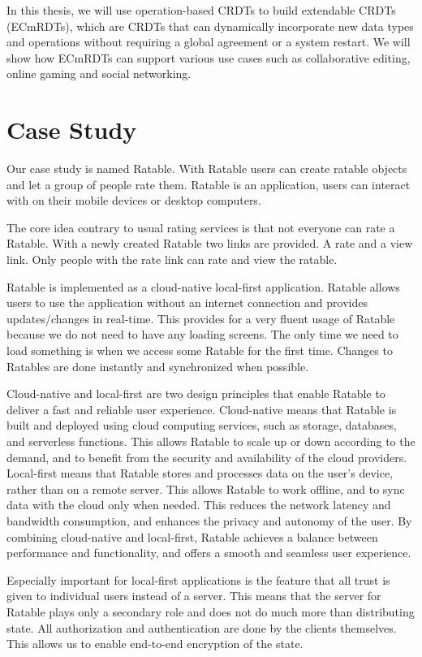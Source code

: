 \documentclass[
	ngerman,
	ruledheaders=section,   %
	class=report,		    %
	thesis={type=bachelor}, %
	accentcolor=9c,			%
	custommargins=true,    %
	marginpar=false,        %
	parskip=half-,          %
	fontsize=11pt,          %
]{tudapub}
\begin{document}
In this thesis, we will use operation-based CRDTs to build extendable CRDTs (ECmRDTs), which are CRDTs that can dynamically incorporate new data types and operations without requiring a global agreement or a system restart. We will show how ECmRDTs can support various use cases such as collaborative editing, online gaming and social networking.

\chapter{Case Study}
Our case study is named Ratable. With Ratable users can create ratable objects and let a group of people rate them. Ratable is an application, users can interact with on their mobile devices or desktop computers. 

The core idea contrary to usual rating services is that not everyone can rate a Ratable. With a newly created Ratable two links are provided. A rate and a view link. Only people with the rate link can rate and view the ratable.

Ratable is implemented as a cloud-native local-first application. Ratable allows users to use the application without an internet connection and provides updates/changes in real-time. This provides for a very fluent usage of Ratable because we do not need to have any loading screens. The only time we need to load something is when we access some Ratable for the first time. Changes to Ratables are done instantly and synchronized when possible.

Cloud-native and local-first are two design principles that enable Ratable to deliver a fast and reliable user experience. Cloud-native means that Ratable is built and deployed using cloud computing services, such as storage, databases, and serverless functions. This allows Ratable to scale up or down according to the demand, and to benefit from the security and availability of the cloud providers. Local-first means that Ratable stores and processes data on the user’s device, rather than on a remote server. This allows Ratable to work offline, and to sync data with the cloud only when needed. This reduces the network latency and bandwidth consumption, and enhances the privacy and autonomy of the user. By combining cloud-native and local-first, Ratable achieves a balance between performance and functionality, and offers a smooth and seamless user experience.

Especially important for local-first applications is the feature that all trust is given to individual users instead of a server. This means that the server for Ratable plays only a secondary role and does not do much more than distributing state. All authorization and authentication are done by the clients themselves. This allows us to enable end-to-end encryption of the state.
\end{document}
